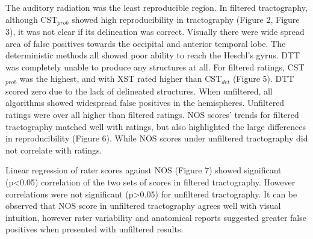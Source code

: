 The auditory radiation was the least reproducible region. In filtered tractography, although CST$_{prob}$ showed high reproducibility in tractography (Figure 2, Figure 3), it was not clear if its delineation was correct. Visually there were wide spread area of false positives towards the occipital and anterior temporal lobe. The deterministic methods all showed poor ability to reach the Heschl’s gyrus. DTT was completely unable to produce any structures at all. For filtered ratings,  CST$_{prob}$ was the highest, and with XST rated higher than CST$_{det}$ (Figure 5). DTT scored zero due to the lack of delineated structures. When unfiltered, all algorithms showed widespread false positives in the hemispheres. Unfiltered ratings were over all higher than filtered ratings. NOS scores’ trends for filtered tractography matched well with ratings, but also highlighted the large differences in reproducibility (Figure 6). While NOS scores under unfiltered tractography did not correlate with ratings. 

Linear regression of rater scores against NOS (Figure 7) showed significant (p\textless0.05) correlation of the two sets of scores in filtered tractography. However correlations were not significant (p\textgreater0.05) for unfiltered tractography. It can be observed that NOS score in unfiltered tractography agrees well with visual intuition, however rater variability and anatomical reports suggested greater false positives when presented with unfiltered results.  


